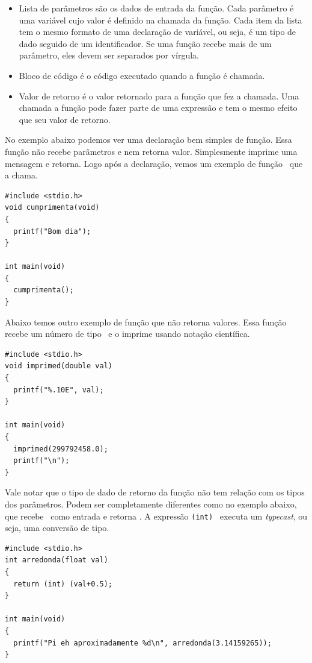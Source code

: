 \begin{itemize}
\item Lista de parâmetros são os dados de entrada da função. Cada parâmetro é uma variável cujo valor é definido na chamada da função. Cada item da lista tem o mesmo formato de uma declaração de variável, ou seja, é um tipo de dado seguido de um identificador. Se uma função recebe mais de um parâmetro, eles devem ser separados por vírgula.

\item Bloco de código é o código executado quando a função é chamada.

\item Valor de retorno é o valor retornado para a função que fez a chamada. Uma chamada a função pode fazer parte de uma expressão e tem o mesmo efeito que seu valor de retorno.

\end{itemize}

No exemplo abaixo podemos ver uma declaração bem simples de função. Essa função não recebe parâmetros e nem retorna valor. Simplesmente imprime uma mensagem e retorna. Logo após a declaração, vemos um exemplo de função \MAIN\ que a chama.

\begin{lstlisting}
#include <stdio.h>
void cumprimenta(void)
{
  printf("Bom dia");
}

int main(void)
{
  cumprimenta();
}
\end{lstlisting}

Abaixo temos outro exemplo de função que não retorna valores. Essa função recebe um número de tipo \DOUBLE\ e o imprime usando notação científica.

\begin{lstlisting}
#include <stdio.h>
void imprimed(double val)
{
  printf("%.10E", val);
}

int main(void)
{
  imprimed(299792458.0);
  printf("\n");
}
\end{lstlisting}

Vale notar que o tipo de dado de retorno da função não tem relação com os tipos dos parâmetros. Podem ser completamente diferentes como no exemplo abaixo, que recebe \FLOAT\ como entrada e retorna \INT. A expressão {\tt (int) } executa um {\it typecast}, ou seja, uma conversão de tipo. 

\begin{lstlisting}
#include <stdio.h>
int arredonda(float val)
{
  return (int) (val+0.5);
}

int main(void)
{
  printf("Pi eh aproximadamente %d\n", arredonda(3.14159265));
}
\end{lstlisting}


